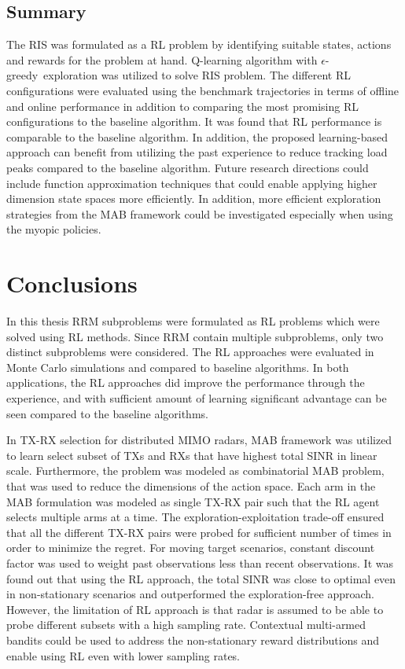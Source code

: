 \documentclass[english, 12pt, a4paper, elec, utf8, a-1b, online]{aaltothesis}
\newcommand{\egreedy}{$\epsilon$-greedy~}
\begin{document}
\subsection{Summary}

The RIS was formulated as a RL problem by identifying suitable states, actions and rewards for the problem at hand.
Q-learning algorithm with \egreedy exploration was utilized to solve RIS problem.
The different RL configurations were evaluated using the benchmark trajectories in terms of offline and online performance in addition to comparing the most promising RL configurations to the baseline algorithm.
It was found that RL performance is comparable to the baseline algorithm.
In addition, the proposed learning-based approach can benefit from utilizing the past experience to reduce tracking load peaks compared to the baseline algorithm.
Future research directions could include function approximation techniques that could enable applying higher dimension state spaces more efficiently. 
In addition, more efficient exploration strategies from the MAB framework could be investigated especially when using the myopic policies.


\newpage
\section{Conclusions} \label{sec:conclusions}

In this thesis RRM subproblems were formulated as RL problems which were solved using RL methods. 
Since RRM contain multiple subproblems, only two distinct subproblems were considered. 
The RL approaches were evaluated in Monte Carlo simulations and compared to baseline algorithms. 
In both applications, the RL approaches did improve the performance through the experience, and with sufficient amount of learning significant advantage can be seen compared to the baseline algorithms.

In TX-RX selection for distributed MIMO radars, MAB framework was utilized to learn select subset of TXs and RXs that have highest total SINR in linear scale. 
Furthermore, the problem was modeled as combinatorial MAB problem, that was used to reduce the dimensions of the action space.  
Each arm in the MAB formulation was modeled as  single TX-RX pair such that the RL agent selects multiple arms at a time. 
The exploration-exploitation trade-off ensured that all the different TX-RX pairs were probed for sufficient number of times in order to minimize the regret. 
For moving target scenarios, constant discount factor was used to weight past observations less than recent observations. 
It was found out that using the RL approach, the total SINR was close to optimal even in non-stationary scenarios and outperformed the exploration-free approach. 
However, the limitation of RL approach is that radar is assumed to be able to probe different subsets with a high sampling rate.
Contextual multi-armed bandits could be used to address the non-stationary reward distributions and enable using RL even with lower sampling rates. 
\end{document}
